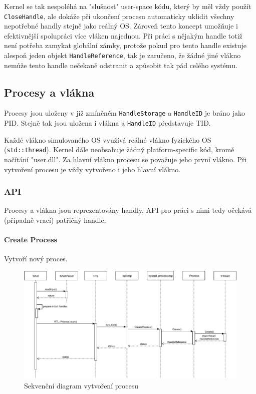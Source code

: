 \documentclass[11pt,a4paper]{scrartcl}
\begin{document}
	Kernel se tak nespoléhá na "slušnost" user-space kódu, který by měl vždy použít \verb|CloseHandle|, ale dokáže při ukončení procesu automaticky uklidit všechny nepotřebné handly stejně jako reálný OS. Zároveň tento koncept umožňuje i efektivnější spolupráci více vláken najednou. Při práci s nějakým handle totiž není potřeba zamykat globální zámky, protože pokud pro tento handle existuje alespoň jeden objekt \verb|HandleReference|, tak je zaručeno, že žádné jiné vlákno nemůže tento handle nečekaně odstranit a způsobit tak pád celého systému.
	
	\subsection{Procesy a vlákna}
	
	Procesy jsou uloženy v již zmíněném \verb|HandleStorage| a \verb|HandleID| je bráno jako PID. Stejně tak jsou uložena i vlákna a \verb|HandleID| představuje TID.
	
	Každé vlákno simulovaného OS využívá reálné vlákno fyzického OS (\verb|std::thread|). Kernel dále neobsahuje žádný platform-specific kód, kromě načítání "user.dll". Za hlavní vlákno procesu se považuje jeho první vlákno. Při vytvoření procesu je vždy vytvořeno i jeho hlavní vlákno.
	
	\subsubsection{API}
	Procesy a vlákna jsou reprezentovány handly, API pro práci s nimi tedy očekává (případně vrací) patřičný handle.
	
	\paragraph{Create Process}
	Vytvoří nový proces.
	
	\begin{figure}[H]
		\centering
		\includegraphics[width=14cm]{create-process-seq.pdf}
		\caption{Sekvenční diagram vytvoření procesu}
		\label{fig:create-process-seq}
	\end{figure}
	
\end{document}
